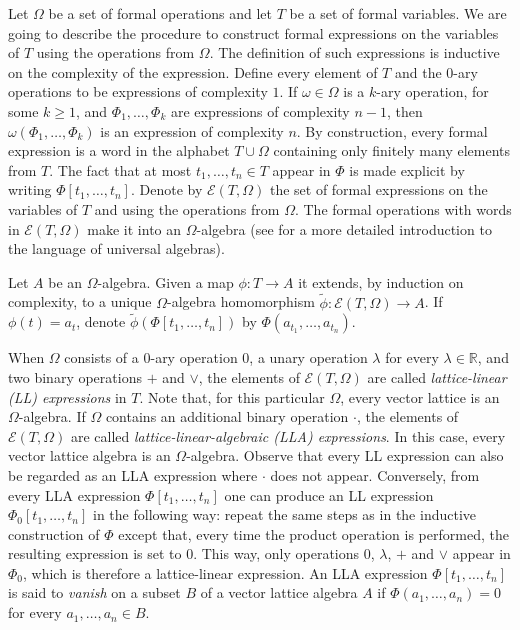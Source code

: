 \documentclass{memo-l}
\theoremstyle{definition}
\theoremstyle{remark}
\numberwithin{section}{chapter}
\numberwithin{equation}{chapter}
\newcommand\R{\ensuremath{\mathbb{R}}}
\begin{document}
Let $\Omega $ be a set of formal operations and let $T$ be a set of
formal variables. We are going to describe the procedure to construct formal
expressions on the variables of $T$ using the operations from
$\Omega $. The definition of such expressions is inductive on the
complexity of the expression. Define every element of $T$ and the
0-ary operations
to be expressions of complexity $1$. If $\omega \in \Omega $ is a
$k$-ary operation, for some $k\ge 1$, and $\Phi _1,\ldots ,\Phi _k
$ are expressions of complexity $n-1$, then $\omega (\Phi _1,\ldots
,\Phi _k)$ is an expression of complexity $n$. By construction, every formal
expression is a word in the alphabet $T\cup \Omega $
containing only finitely many elements from $T$. The
fact that at most $t_1,\ldots ,t_n \in T$ appear in $\Phi $ is made
explicit by writing $\Phi [t_1,\ldots ,t_n]$. Denote by
$\mathcal{E}(T,\Omega )$ the set of formal expressions on the
variables of $T$ and using the operations from $\Omega $. The formal
operations with words in $\mathcal{E}(T,\Omega )$ make it into an
$\Omega $-algebra (see \cite[Section 3]{de_jeu2021} for a more
detailed introduction to the language of universal algebras).

Let $A$ be an $\Omega $-algebra. Given a map $\phi \colon T\to A$ it
extends, by induction on complexity, to a unique $\Omega $-algebra
homomorphism $\tilde \phi \colon \mathcal{E}(T,\Omega )\to A$. If
$\phi (t)=a_t$, denote $\tilde \phi (\Phi [t_1,\ldots ,t_n])$ by
$\Phi (a_{t_1},\ldots ,a_{t_n})$.

When $\Omega $ consists of a 0-ary operation $0$, a unary operation
$\lambda $ for every $\lambda \in \R$, and two binary operations
$+$ and $\vee$, the elements of $\mathcal{E}(T,\Omega )$ are called
\emph{lattice-linear (LL) expressions} in $T$. Note that, for this
particular $\Omega $,
every vector lattice is an $\Omega $-algebra. If $\Omega $ contains an
additional binary operation $\cdot $, the elements of
$\mathcal{E}(T,\Omega )$ are called \emph{lattice-linear-algebraic (LLA)
expressions}. In this case, every vector lattice algebra is an $\Omega
$-algebra. Observe that every LL expression can also be regarded as an
LLA expression where $\cdot $ does not appear. Conversely, from every
LLA expression $\Phi [t_1,\ldots ,t_n]$ one can produce an LL expression
$\Phi _0[t_1,\ldots ,t_n]$ in the following way: repeat the same steps
as in the inductive construction of $\Phi $ except that, every time the
product operation is performed, the resulting expression is set to
$0$. This way, only operations $0$, $\lambda $, $+$ and $\vee $ appear
in $\Phi _0$, which is therefore a lattice-linear expression. An LLA
expression $\Phi[t_1,\ldots ,t_n]$ is said to \emph{vanish} on a
subset $B$ of a vector lattice algebra $A$ if $\Phi
(a_1,\ldots ,a_n)=0$ for every $a_1,\ldots ,a_n \in B$.
\end{document}
